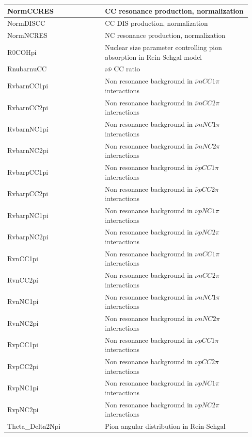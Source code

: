 {\begin{longtable}{|p{0.4\linewidth}|p{0.6\linewidth}|}
 NormCCRES & CC resonance production, normalization \\ \hline
 NormDISCC & CC DIS production, normalization  \\ \hline
 NormNCRES & NC resonance production, normalization  \\ \hline
 R0COHpi & Nuclear size parameter controlling pion absorption  in Rein-Sehgal model  \\ \hline
 RnubarnuCC & $\nu\bar{\nu} $ CC ratio\\ \hline
 RvbarnCC1pi & Non resonance background in $ \bar{\nu} n CC 1\pi$ interactions \\ \hline
 RvbarnCC2pi & Non resonance background in $ \bar{\nu} n CC 2\pi$ interactions \\ \hline
 RvbarnNC1pi & Non resonance background in $ \bar{\nu} n NC 1\pi$ interactions \\ \hline
 RvbarnNC2pi & Non resonance background in $ \bar{\nu} n NC 2\pi$ interactions \\ \hline
 RvbarpCC1pi & Non resonance background in $ \bar{\nu} p CC 1\pi$ interactions \\ \hline
 RvbarpCC2pi & Non resonance background in $ \bar{\nu} p CC2\pi$ interactions \\ \hline
 RvbarpNC1pi & Non resonance background in $ \bar{\nu} p NC1\pi$ interactions \\ \hline
 RvbarpNC2pi & Non resonance background in $ \bar{\nu} p NC2\pi$ interactions \\ \hline
 RvnCC1pi & Non resonance background in $\nu n CC1\pi$ interactions \\ \hline
 RvnCC2pi & Non resonance background in $\nu n CC2\pi$ interactions \\ \hline
 RvnNC1pi & Non resonance background in $\nu n NC1\pi$ interactions \\ \hline
 RvnNC2pi & Non resonance background in $\nu n NC2\pi$ interactions  \\ \hline
 RvpCC1pi & Non resonance background in $\nu p CC1\pi$ interactions \\ \hline
 RvpCC2pi & Non resonance background in $\nu p CC2\pi$ interactions  \\ \hline
 RvpNC1pi & Non resonance background in $\nu p NC1\pi$ interactions \\ \hline
 RvpNC2pi & Non resonance background in $\nu p NC2\pi$ interactions \\ \hline
 Theta\_Delta2Npi & Pion angular distribution in Rein-Sehgal \\ \hline

\end{longtable}}

